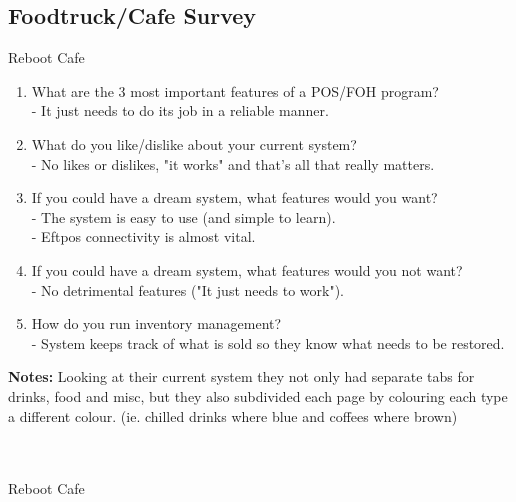 \subsection{Foodtruck/Cafe Survey} \label{subsec:StakeholderSurvey}
{\large Reboot Cafe \par}
\begin{enumerate}
	\item What are the 3 most important features of a POS/FOH program?\\
	 - It just needs to do its job in a reliable manner.
	\item What do you like/dislike about your current system?\\
	 - No likes or dislikes, "it works" and that's all that really matters.
	\item If you could have a dream system, what features would you want?\\
	 - The system is easy to use (and simple to learn).\\
	 - Eftpos connectivity is almost vital.
	\item If you could have a dream system, what features would you not want?\\
	 - No detrimental features ("It just needs to work").
	\item How do you run inventory management?\\
	 - System keeps track of what is sold so they know what needs to be restored.
\end{enumerate}
\textbf{Notes:}
Looking at their current system they not only had separate tabs for drinks, food and misc, but they also subdivided each page by colouring each type a different colour. (ie. chilled drinks where blue and coffees where brown)\\\\\\
{\large Reboot Cafe \par}
